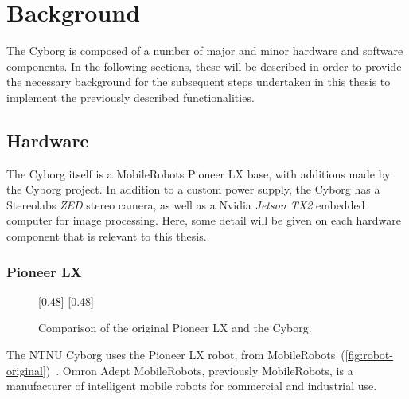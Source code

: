 \documentclass[\rootfolder/main.tex]{subfiles}
\begin{document}
\chapter{Background}
\label{ch:background}

The Cyborg is composed of a number of major and minor hardware and software components.
In the following sections, these will be described in order to provide the necessary background for the subsequent steps undertaken in this thesis to implement the previously described functionalities.


\section{Hardware}

The Cyborg itself is a MobileRobots Pioneer LX base, with additions made by the Cyborg project.
In addition to a custom power supply, the Cyborg has a Stereolabs \emph{ZED} stereo camera, as well as a Nvidia \emph{Jetson TX2} embedded computer for image processing.
Here, some detail will be given on each hardware component that is relevant to this thesis.


\subsection{Pioneer LX}

\begin{figure}[h]
    \centering
    [0.48\columnwidth]{}%
    [0.48\columnwidth]{}
    \caption{Comparison of the original Pioneer LX and the Cyborg.}
    \label{fig:robot-comparison}
\end{figure}

The NTNU Cyborg uses the Pioneer LX robot, from MobileRobots~(\cref{fig:robot-original})~\cite{MobileRobots}.
Omron Adept MobileRobots, previously MobileRobots, is a manufacturer of intelligent mobile robots for commercial and industrial use.
\end{document}
